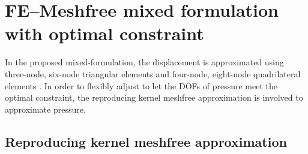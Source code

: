 
\section{FE--Meshfree mixed formulation with optimal constraint}

In the proposed mixed-formulation, the displacement is approximated using three-node, six-node triangular elements and four-node, eight-node quadrilateral elements \cite{hughes2000}. In order to flexibly adjust to let the DOFs of pressure meet the optimal constraint, the reproducing kernel meshfree approximation is involved to approximate pressure.

\subsection{Reproducing kernel meshfree approximation}

